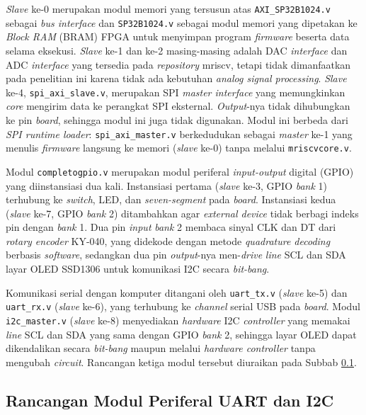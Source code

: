 \textit{Slave} ke-0 merupakan modul memori yang tersusun atas \texttt{AXI\_SP32B1024.v} sebagai \textit{bus interface} dan \texttt{SP32B1024.v} sebagai modul memori yang dipetakan ke \textit{Block RAM} (BRAM) FPGA untuk menyimpan program \textit{firmware} beserta data selama eksekusi. \textit{Slave} ke-1 dan ke-2 masing-masing adalah DAC \textit{interface} dan ADC \textit{interface} yang tersedia pada \textit{repository} mriscv, tetapi tidak dimanfaatkan pada penelitian ini karena tidak ada kebutuhan \textit{analog signal processing}. \textit{Slave} ke-4, \texttt{spi\_axi\_slave.v}, merupakan SPI \textit{master interface} yang memungkinkan \textit{core} mengirim data ke perangkat SPI eksternal. \textit{Output}-nya tidak dihubungkan ke pin \textit{board}, sehingga modul ini juga tidak digunakan. Modul ini berbeda dari \textit{SPI runtime loader}: \texttt{spi\_axi\_master.v} berkedudukan sebagai \textit{master} ke-1 yang menulis \textit{firmware} langsung ke memori (\textit{slave} ke-0) tanpa melalui \texttt{mriscvcore.v}.

Modul \texttt{completogpio.v} merupakan modul periferal \textit{input-output} digital (GPIO) yang diinstansiasi dua kali. Instansiasi pertama (\textit{slave} ke-3, GPIO \textit{bank} 1) terhubung ke \textit{switch}, LED, dan \textit{seven-segment} pada \textit{board}. Instansiasi kedua (\textit{slave} ke-7, GPIO \textit{bank} 2) ditambahkan agar \textit{external device} tidak berbagi indeks pin dengan \textit{bank} 1. Dua pin \textit{input} \textit{bank} 2 membaca sinyal CLK dan DT dari \textit{rotary encoder} KY-040, yang didekode dengan metode \textit{quadrature decoding} berbasis \textit{software}, sedangkan dua pin \textit{output}-nya men-\textit{drive} \textit{line} SCL dan SDA layar OLED SSD1306 untuk komunikasi I2C secara \textit{bit-bang}.

Komunikasi serial dengan komputer ditangani oleh \texttt{uart\_tx.v} (\textit{slave} ke-5) dan \texttt{uart\_rx.v} (\textit{slave} ke-6), yang terhubung ke \textit{channel} serial USB pada \textit{board}. Modul \texttt{i2c\_master.v} (\textit{slave} ke-8) menyediakan \textit{hardware} I2C \textit{controller} yang memakai \textit{line} SCL dan SDA yang sama dengan GPIO \textit{bank} 2, sehingga layar OLED dapat dikendalikan secara \textit{bit-bang} maupun melalui \textit{hardware controller} tanpa mengubah \textit{circuit}. Rancangan ketiga modul tersebut diuraikan pada Subbab \ref{subsec:rancangan-uart-i2c}.

\subsection{Rancangan Modul Periferal UART dan I2C}
\label{subsec:rancangan-uart-i2c}

